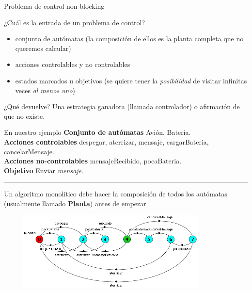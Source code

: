\begin{frame}{Problema de control non-blocking}
    \begin{block}{¿Cuál es la entrada de un problema de control?}
        \begin{itemize}
          \item conjunto de autómatas (la composición de ellos es la planta completa que no queremos calcular)
          \item acciones controlables y no controlables
          \item estados marcados u objetivos (se quiere tener la \textit{posibilidad} de visitar infinitas veces \textit{al menos uno})
        \end{itemize}
    \end{block}

    \begin{block}{¿Qué devuelve?}
        Una estrategia ganadora (llamada controlador) o afirmación de que no existe.
    \end{block}

\end{frame}
\begin{frame}{En nuestro ejemplo}
    \textbf{Conjunto de autómatas} Avión, Batería.\\
    \textbf{Acciones controlables} despegar, aterrizar, mensaje, cargarBateria, cancelarMensaje.\\
    \textbf{Acciones no-controlables} mensajeRecibido, pocaBateria.\\
    \textbf{Objetivo} Enviar \textit{mensaje}.
    
    \vspace{-15pt}\noindent\rule{\textwidth}{0.2pt}
    Un algoritmo monolítico debe hacer la composición de todos los autómatas (usualmente llamado \textbf{Planta}) antes de empezar
    \begin{figure}
     \includegraphics[width=0.85\textwidth]{figures/plantaMarcada.png}
    \end{figure}
    
\end{frame}
